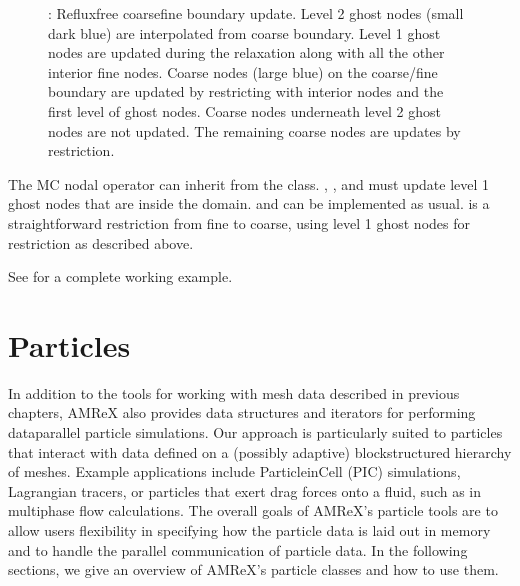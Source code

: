 \documentclass[letterpaper,10pt,english]{sphinxmanual}
\begin{document}
\begin{itemize}
\begin{figure}[htbp]
\noindent{}
\caption{: Reflux\sphinxhyphen{}free coarse\sphinxhyphen{}fine boundary update.
Level 2 ghost nodes (small dark blue) are interpolated from coarse boundary.
Level 1 ghost nodes are updated during the relaxation along with all the other interior fine nodes.
Coarse nodes (large blue) on the coarse/fine boundary are updated by restricting with interior nodes
and the first level of ghost nodes.
Coarse nodes underneath level 2 ghost nodes are not updated.
The remaining coarse nodes are updates by restriction.}\label{\detokenize{LinearSolvers:id2}}\label{\detokenize{LinearSolvers:fig-refluxfreecoarsefine}}\end{figure}

\sphinxAtStartPar
The MC nodal operator can inherit from the  class.
, , and  must update level 1 ghost nodes that are inside the domain.
 and  can be implemented as usual.
 is a straightforward restriction from fine to coarse, using level 1 ghost nodes for restriction as described above.

\sphinxAtStartPar
See  for a complete working example.

\end{itemize}


\chapter{Particles}
\label{\detokenize{Particle_Chapter:particles}}\label{\detokenize{Particle_Chapter:chap-particles}}\label{\detokenize{Particle_Chapter::doc}}
\sphinxAtStartPar
In addition to the tools for working with mesh data described in previous
chapters, AMReX also provides data structures and iterators for performing
data\sphinxhyphen{}parallel particle simulations. Our approach is particularly suited to
particles that interact with data defined on a (possibly adaptive)
block\sphinxhyphen{}structured hierarchy of meshes. Example applications include
Particle\sphinxhyphen{}in\sphinxhyphen{}Cell (PIC) simulations, Lagrangian tracers, or particles that exert
drag forces onto a fluid, such as in multi\sphinxhyphen{}phase flow calculations. The overall
goals of AMReX’s particle tools are to allow users flexibility in specifying
how the particle data is laid out in memory and to handle the parallel
communication of particle data. In the following sections, we
give an overview of AMReX’s particle classes and how to use them.
\end{document}
